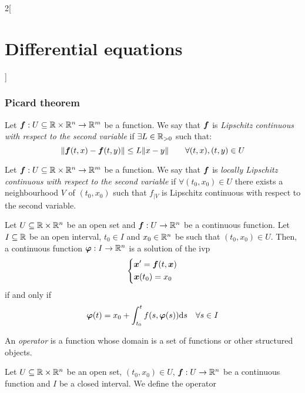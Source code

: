 \documentclass[../../../main.tex]{subfiles}
\begin{document}
\begin{multicols}{2}[\section{Differential equations}]
  \subsubsection*{Picard theorem}
  \begin{definition}
    Let $\boldsymbol{f}:U\subseteq\mathbb{R}\times\mathbb{R}^n\rightarrow\mathbb{R}^m$ be a function. We say that $\boldsymbol{f}$ is \textit{Lipschitz continuous with respect to the second variable} if $\exists L\in\mathbb{R}_{>0}$ such that: $$\|\boldsymbol{f}(t,x)-\boldsymbol{f}(t,y)\|\leq L\|x-y\|\qquad\forall (t,x),(t,y)\in U$$
  \end{definition}
  \begin{definition}
    Let $\boldsymbol{f}:U\subseteq\mathbb{R}\times\mathbb{R}^n\rightarrow\mathbb{R}^m$ be a function. We say that $\boldsymbol{f}$ is \textit{locally Lipschitz continuous with respect to the second variable} if $\forall (t_0,x_0)\in U$ there exists a neighbourhood $V$ of $(t_0,x_0)$ such that $f_{|V}$ is Lipschitz continuous with respect to the second variable.
  \end{definition}
  \begin{prop}
    Let $U\subseteq\mathbb{R}\times\mathbb{R}^n$ be an open set and $\boldsymbol{f}:U\rightarrow\mathbb{R}^n$ be a continuous function. Let $I\subseteq\mathbb{R}$ be an open interval, $t_0\in I$ and $x_0\in\mathbb{R}^n$ be such that $(t_0,x_0)\in U$. Then, a continuous function $\boldsymbol{\varphi}:I\rightarrow\mathbb{R}^n$ is a solution of the ivp
    \begin{equation}
      \left\{
      \begin{aligned}
         & \boldsymbol{x}'=\boldsymbol{f}(t,\boldsymbol{x}) \\
         & \boldsymbol{x}(t_0)=x_0
      \end{aligned}
      \right.
      \label{DE_ivp}
    \end{equation}
    if and only if $$\boldsymbol{\varphi}(t)=x_0+\int_{t_0}^tf(s,\boldsymbol{\varphi}(s))\dd s\quad\forall s\in I$$
  \end{prop}
  \begin{definition}
    An \textit{operator} is a function whose domain is a set of functions or other structured objects.
  \end{definition}
  \begin{definition}
    Let $U\subseteq\mathbb{R}\times\mathbb{R}^n$ be an open set, $(t_0,x_0)\in U$, $\boldsymbol{f}:U\rightarrow\mathbb{R}^n$ be a continuous function and $I$ be a closed interval. We define the operator
    \begin{align*}

\end{align*}
\end{definition}
\end{multicols}
\end{document}
